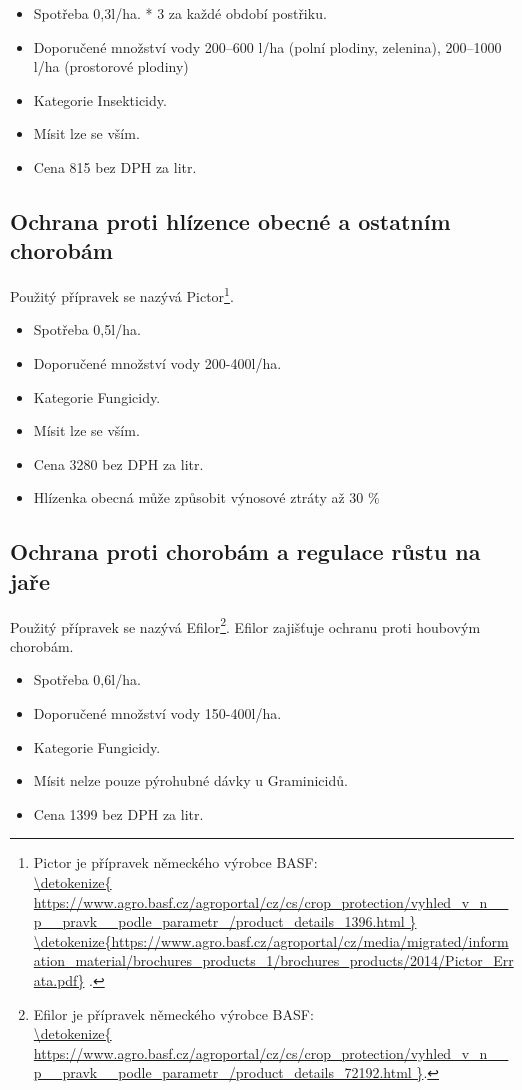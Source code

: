 \begin{itemize}
  \item Spotřeba 0,3l/ha. * 3 za každé období postřiku.
  \item Doporučené množství vody 200–600 l/ha (polní plodiny, zelenina), 200–1000 l/ha (prostorové plodiny) 
  \item Kategorie Insekticidy.
  \item Mísit lze se vším.
  \item Cena 815 bez DPH za litr.
\end{itemize}

\subsection{Ochrana proti hlízence obecné a ostatním chorobám}
Použitý přípravek se nazývá Pictor\footnote{Pictor je přípravek německého výrobce BASF: \\\url{\detokenize{
https://www.agro.basf.cz/agroportal/cz/cs/crop_protection/vyhled_v_n__p__pravk__podle_parametr_/product_details_1396.html
}}
\\\url{\detokenize{https://www.agro.basf.cz/agroportal/cz/media/migrated/information_material/brochures_products_1/brochures_products/2014/Pictor_Errata.pdf}}
.}.
\begin{itemize}
  \item Spotřeba 0,5l/ha.
  \item Doporučené množství vody 200-400l/ha.
  \item Kategorie Fungicidy.
  \item Mísit lze se vším.
  \item Cena 3280 bez DPH za litr.
  \item Hlízenka obecná může způsobit výnosové 
ztráty až 30 \%
\end{itemize}


\subsection{Ochrana proti chorobám a regulace růstu na jaře}
Použitý přípravek se nazývá Efilor\footnote{Efilor je přípravek německého výrobce BASF: \\\url{\detokenize{
https://www.agro.basf.cz/agroportal/cz/cs/crop_protection/vyhled_v_n__p__pravk__podle_parametr_/product_details_72192.html
}}.}.
Efilor zajišťuje ochranu proti houbovým chorobám.
\begin{itemize}
  \item Spotřeba 0,6l/ha.
  \item Doporučené množství vody 150-400l/ha.
  \item Kategorie Fungicidy.
  \item Mísit nelze pouze pýrohubné dávky u Graminicidů.
  \item Cena 1399 bez DPH za litr.
\end{itemize}

